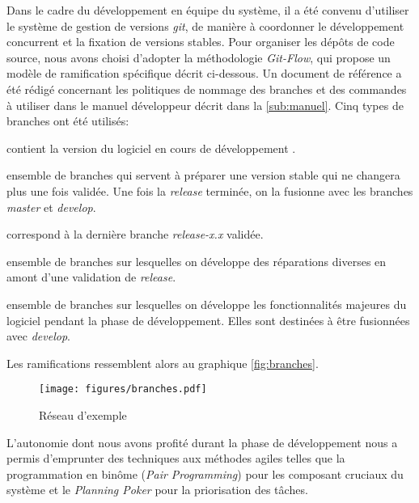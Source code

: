 			Dans le cadre du développement en équipe du système, il a été convenu d'utiliser le système de gestion de versions \emph{git}, de manière à coordonner le développement concurrent et la fixation de versions stables. Pour organiser les dépôts de code source, nous avons choisi d'adopter la méthodologie \emph{Git-Flow}, qui propose un modèle de ramification spécifique décrit ci-dessous. Un document de référence a été rédigé concernant les politiques de nommage des branches et des commandes à utiliser dans le manuel développeur décrit dans la \autoref{sub:manuel}.
			Cinq types de branches ont été utilisés:
			\begin{description}[noitemsep, before={\setcounter{descriptcount}{0}},font=\bfseries\stepcounter{descriptcount}\thedescriptcount.~]
				\item[\emph{develop}:] contient la version du logiciel en cours de développement .
				\item[\emph{release-<version>}:] ensemble de branches qui servent à préparer une version stable qui ne changera plus une fois validée. Une fois la \emph{release} terminée, on la fusionne avec les branches \emph{master} et \emph{develop}.
				\item[\emph{master}:] correspond à la dernière branche \emph{release-x.x} validée.
				\item[\emph{hotfix-<raison>}:] ensemble de branches sur lesquelles on développe des réparations diverses en amont d'une validation de \emph{release}.
				\item[\emph{feature-<nom>}:] ensemble de branches sur lesquelles on développe les fonctionnalités majeures du logiciel pendant la phase de développement. Elles sont destinées à être fusionnées avec \emph{develop}.
			\end{description}
			Les ramifications ressemblent alors au graphique \autoref{fig:branches}.
			\begin{figure}[h]
			{
				\centering
				\texttt{[image: figures/branches.pdf]}
				\caption{Réseau d'exemple}
				\label{fig:branches}
			}
			\end{figure}
			
			\par
			L'autonomie dont nous avons profité durant la phase de développement nous a permis d'emprunter des techniques aux méthodes agiles telles que la programmation en binôme (\emph{Pair Programming}) pour les composant cruciaux du système et le \emph{Planning Poker} pour la priorisation des tâches.
			
